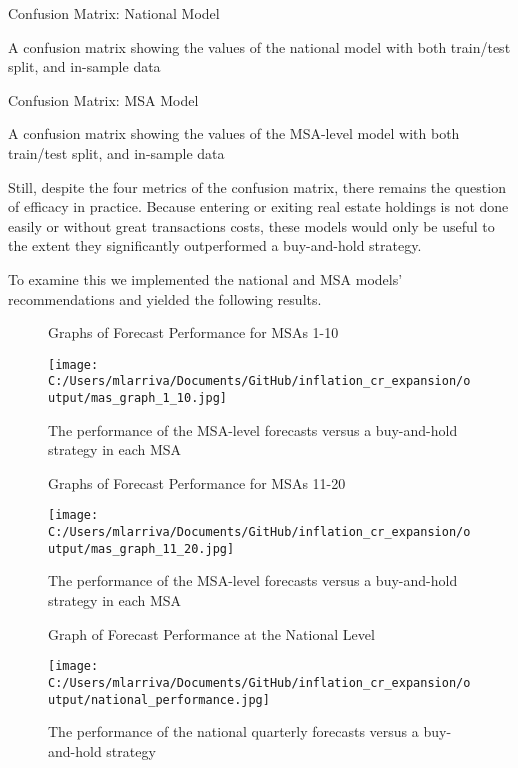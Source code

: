 \begin{table}[H]
\centering
\caption*{Confusion Matrix: National Model}
\caption{A confusion matrix showing the values of the national model with both train/test split, and in-sample data}
\end{table}

\begin{table}[H]
\centering
\caption*{Confusion Matrix: MSA Model}
\caption{A confusion matrix showing the values of the MSA-level model with both train/test split, and in-sample data}
\end{table}

Still, despite the four metrics of the confusion matrix, there remains the question of efficacy in practice. Because entering or exiting real estate holdings is not done easily or without great transactions costs, these models would only be useful to the extent they significantly outperformed a buy-and-hold strategy.

To examine this we implemented the national and MSA models' recommendations and yielded the following results.

\begin{figure}[H]
\hspace*{-0.25in}
\caption*{Graphs of Forecast Performance for MSAs 1-10}
\texttt{[image: C:/Users/mlarriva/Documents/GitHub/inflation\_cr\_expansion/output/mas\_graph\_1\_10.jpg]}
\caption{The performance of the MSA-level forecasts versus a buy-and-hold strategy in each MSA}
\end{figure}

\begin{figure}[H]
\hspace*{-0.25in}
\caption*{Graphs of Forecast Performance for MSAs 11-20}
\texttt{[image: C:/Users/mlarriva/Documents/GitHub/inflation\_cr\_expansion/output/mas\_graph\_11\_20.jpg]}
\caption{The performance of the MSA-level forecasts versus a buy-and-hold strategy in each MSA}
\end{figure}

\begin{figure}[H]
\caption*{Graph of Forecast Performance at the National Level}
\texttt{[image: C:/Users/mlarriva/Documents/GitHub/inflation\_cr\_expansion/output/national\_performance.jpg]}
\caption{The performance of the national quarterly forecasts versus a buy-and-hold strategy}
\end{figure}

